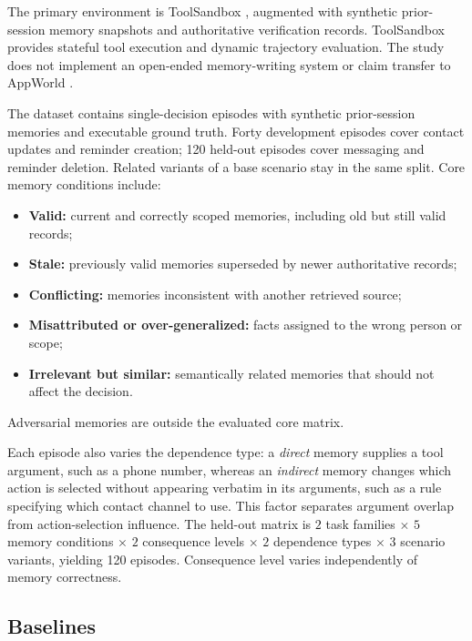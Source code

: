 \documentclass[11pt]{article}
\begin{document}
The primary environment is ToolSandbox \cite{lu2025toolsandbox}, augmented with synthetic prior-session memory snapshots and authoritative verification records. ToolSandbox provides stateful tool execution and dynamic trajectory evaluation. The study does not implement an open-ended memory-writing system or claim transfer to AppWorld \cite{trivedi2024appworld}.

The dataset contains single-decision episodes with synthetic prior-session memories and executable ground truth. Forty development episodes cover contact updates and reminder creation; 120 held-out episodes cover messaging and reminder deletion. Related variants of a base scenario stay in the same split. Core memory conditions include:
\begin{itemize}
  \item \textbf{Valid:} current and correctly scoped memories, including old but still valid records;
  \item \textbf{Stale:} previously valid memories superseded by newer authoritative records;
  \item \textbf{Conflicting:} memories inconsistent with another retrieved source;
  \item \textbf{Misattributed or over-generalized:} facts assigned to the wrong person or scope;
  \item \textbf{Irrelevant but similar:} semantically related memories that should not affect the decision.
\end{itemize}
Adversarial memories are outside the evaluated core matrix.

Each episode also varies the dependence type: a \emph{direct} memory supplies a tool argument, such as a phone number, whereas an \emph{indirect} memory changes which action is selected without appearing verbatim in its arguments, such as a rule specifying which contact channel to use. This factor separates argument overlap from action-selection influence. The held-out matrix is $2$ task families $\times$ $5$ memory conditions $\times$ $2$ consequence levels $\times$ $2$ dependence types $\times$ $3$ scenario variants, yielding 120 episodes. Consequence level varies independently of memory correctness.

\subsection{Baselines}
\end{document}
